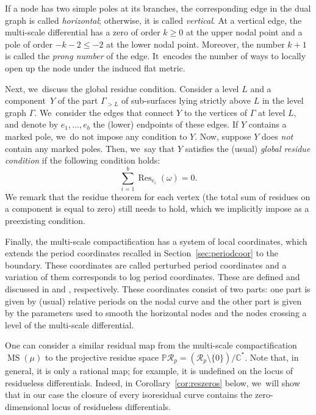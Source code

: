 \documentclass[JEP,XML,SOM,Unicode,NoFloatCountersInSection,published]{cedram}
\DeclareMathOperator\MS{MS}
\DeclareMathOperator\Res{Res}
\theoremstyle{definition}
\begin{document}
If a node has two simple poles at its branches, the corresponding edge in the dual graph is called {\em horizontal}; otherwise, it is called {\em vertical}. At a vertical edge, the multi-scale differential has a zero of order $k\geq0$ at the upper nodal point and a pole of order $-k-2\leq-2$ at the lower nodal point.
Moreover, the number $k+1$ is called the {\em prong number} of the edge. It~encodes the number of ways to locally open up the node under the induced flat metric.

Next, we~discuss the global residue condition. Consider a level $L$ and a component~$Y$ of the part $\Gamma_{>L}$ of sub-surfaces lying strictly above $L$ in the level graph $\Gamma$. We~consider the edges that connect $Y$ to the vertices of $\Gamma$ at level $L$, and denote by $e_{1},\dots,e_{b}$ the (lower) endpoints of these edges.
If $Y$ contains a marked pole, we~do not impose any condition to $Y$. Now, suppose $Y$ does {\em not} contain any marked poles. Then, we~say that $Y$ satisfies the (usual) {\em global residue condition} if the following condition holds:\vspace*{-5pt}
\begin{equation}
\tag*{GRC}\label{GRC} \sum_{i=1}^{b}\Res_{e_{i}}(\omega) = 0.
\end{equation}
We remark that the residue theorem for each vertex (\ie the total sum of residues on a component is equal to zero) still needs to hold, which we implicitly impose as a preexisting condition.

Finally, the multi-scale compactification has a system of local coordinates, which extends the period coordinates recalled in Section~\ref{sec:periodcoor} to the boundary. These coordinates are called perturbed period coordinates and a variation of them corresponds to log period coordinates. These are defined and discussed in \cite[\S\S9.2, 13.3]{BCGGM2} and \cite[\S5]{BenBound}, respectively. These coordinates consist of two parts: one part is given by (usual) relative periods on the nodal curve and the other part is given by the parameters used to smooth the horizontal nodes and the nodes crossing a level of the multi-scale differential.\enlargethispage{\baselineskip}

\label{sub:closure}

One can consider a similar residual map from the multi-scale compactification $\MS(\mu)$ to the projective residue space $\mathbb{P} \mathcal{R}_{p} = (\mathcal{R}_{p} \setminus \{ 0 \}) / \mathbb{C}^{*}$. Note that, in general, it is only a rational map; for example, it is undefined on the locus of residueless differentials. Indeed, in Corollary~\ref{cor:reszeros} below, we~will show that in our case the closure of every isoresidual curve contains the zero-dimensional locus of residueless differentials.
\end{document}
